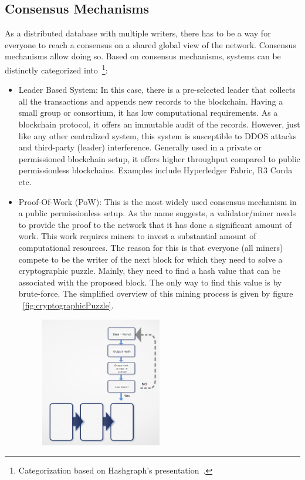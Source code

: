 \subsection{Consensus Mechanisms}
As a distributed database with multiple writers, there has to be a way for
everyone to reach a consensus on a shared global view of the network. Consensus
mechanisms allow doing so. Based on consensus mechanisms, systems can be
distinctly categorized into~\footnote{Categorization based on Hashgraph's presentation~\cite{baird2016hashgraph}.}:
\begin{itemize}
	\item Leader Based System: In this case, there is a pre-selected leader
		that collects all the transactions and appends new records to the
		blockchain. Having a small group or consortium, it has low
		computational requirements. As a blockchain protocol, it offers an
		immutable audit of the records. However, just like any other
		centralized system, this system is susceptible to DDOS attacks and
		third-party (leader) interference. Generally used in a private or
		permissioned blockchain setup, it offers higher throughput compared to
		public permissionless blockchains. Examples include Hyperledger Fabric,
		R3 Corda etc. 
	\item Proof-Of-Work (PoW): This is the most widely used consensus mechanism in a
		public permissionless setup. As the name suggests, a validator/miner
		needs to provide the proof to the network that it has done a
		significant amount of work. This work requires miners to invest a
		substantial amount of computational resources. The reason for this is
		that everyone (all miners) compete to be the writer of the next block
		for which they need to solve a cryptographic puzzle. Mainly, they need
		to find a hash value that can be associated with the proposed block.
		The only way to find this value is by brute-force.  The simplified
		overview of this mining process is given by figure
		~\ref{fig:cryptographicPuzzle}. 
		\begin{figure}
			\begin{center}
			\includegraphics[width=0.5\textwidth]{Images/CryptographicPuzzle.eps}

\end{center}
\end{figure}
\end{itemize}
